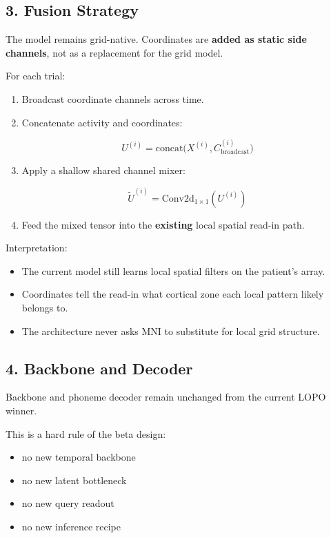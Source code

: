 \documentclass[
]{article}
\providecommand{\tightlist}{%
  \setlength{\itemsep}{0pt}\setlength{\parskip}{0pt}}
\begin{document}
\subsection{3. Fusion Strategy}\label{fusion-strategy}

The model remains grid-native. Coordinates are \textbf{added as static
side channels}, not as a replacement for the grid model.

For each trial:

\begin{enumerate}
\def\labelenumi{\arabic{enumi}.}
\item
  Broadcast coordinate channels across time.
\item
  Concatenate activity and coordinates:

  \[
  U^{(i)} = \mathrm{concat}\bigl(X^{(i)}, C^{(i)}_{\text{broadcast}}\bigr)
  \]
\item
  Apply a shallow shared channel mixer:

  \[
  \tilde{U}^{(i)} = \mathrm{Conv2d}_{1 \times 1}(U^{(i)})
  \]
\item
  Feed the mixed tensor into the \textbf{existing} local spatial read-in
  path.
\end{enumerate}

Interpretation:

\begin{itemize}
\tightlist
\item
  The current model still learns local spatial filters on the patient's
  array.
\item
  Coordinates tell the read-in what cortical zone each local pattern
  likely belongs to.
\item
  The architecture never asks MNI to substitute for local grid
  structure.
\end{itemize}

\subsection{4. Backbone and Decoder}\label{backbone-and-decoder}

Backbone and phoneme decoder remain unchanged from the current LOPO
winner.

This is a hard rule of the beta design:

\begin{itemize}
\tightlist
\item
  no new temporal backbone
\item
  no new latent bottleneck
\item
  no new query readout
\item
  no new inference recipe
\end{itemize}
\end{document}
